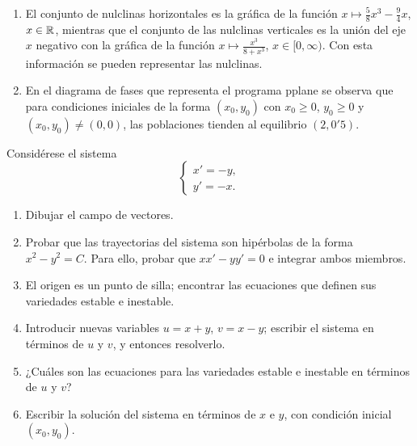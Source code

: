 \documentclass[11pt]{report}
\begin{document}
\begin{solution}
\begin{enumerate}
\begin{itemize}
        \end{itemize}
    \item El conjunto de nulclinas horizontales es la gráfica de la función $x \mapsto \frac{5}{8}x^3-\frac{9}{4}x$, $x \in \mathbb R$, mientras que el conjunto de las nulclinas verticales es la unión del eje $x$ negativo con la gráfica de la función $x \mapsto \frac{x^3}{8+x^3}$, $x \in [0,\infty)$. Con esta información se pueden representar las nulclinas.
    \item En el diagrama de fases que representa el programa \textup{pplane} se observa que para condiciones iniciales de la forma $(x_0,y_0)$ con $x_0\geq 0$, $y_0\geq0$ y $(x_0,y_0)\neq (0,0)$, las poblaciones tienden al equilibrio $(2,0'5)$.
    \end{enumerate}
\end{solution}

\begin{exercise}
    Considérese el sistema
    \[\begin{cases}
        x' = -y, \\
        y' = -x.
    \end{cases}\]
    \begin{enumerate}
        \item Dibujar el campo de vectores.
        \item Probar que las trayectorias del sistema son hipérbolas de la forma $x^2-y^2 = C$. Para ello, probar que $xx'-yy'=0$ e integrar ambos miembros.
        \item El origen es un punto de silla; encontrar las ecuaciones que definen sus variedades estable e inestable.
        \item Introducir nuevas variables $u = x+y$, $v = x-y$; escribir el sistema en términos de $u$ y $v$, y entonces resolverlo. 
        \item ¿Cuáles son las ecuaciones para las variedades estable e inestable en términos de $u$ y $v$?
        \item Escribir la solución del sistema en términos de $x$ e $y$, con condición inicial $(x_0,y_0)$.
    \end{enumerate}
\end{exercise}
\end{document}

